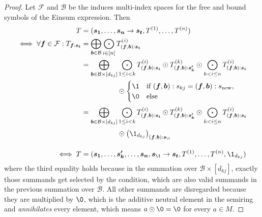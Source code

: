 \begin{proof}
    \small
    Let $\mathcal{F}$ and $\mathcal{B}$ be the induces multi-index spaces for the free and bound symbols of the Einsum expression.
    Then
    \begin{align*}
        T                                                        & = (\bm{s_1}, \dots, \bm{s_n} \rightarrow \bm{s_t}, T^{(1)}, \dots, T^{(n)})                                                                                                                                                                        \\
        \iff \forall \bm{f} \in \mathcal{F}: T_{\bm{f}:\bm{s_t}} & = \bigoplus\limits_{\bm{b} \in \mathcal{B}} \bigodot\limits_{i \in [n]} T^{(i)}_{(\bm{f}, \bm{b}):\bm{s_i}}                                                                                                                                        \\
                                                                 & = \bigoplus\limits_{\bm{b} \in \mathcal{B} \times [d_{kj}]} \bigodot\limits_{1 \leq i < k} T^{(i)}_{(\bm{f}, \bm{b}):\bm{s_i}} \odot T^{(k)}_{(\bm{f}, \bm{b}):\bm{s'_k}} \odot \bigodot\limits_{k < i \leq n} T^{(i)}_{(\bm{f}, \bm{b}):\bm{s_i}} \\
                                                                 & \phantom{{}=\bigoplus\limits_{\bm{b} \in \mathcal{B} \times [d_{kj}]}} \odot \begin{cases}
            \1 & \text{if $(\bm{f}, \bm{b}): s_{kj} = (\bm{f}, \bm{b}): s_{\text{new}}$}, \\
            \0 & \text{else}
        \end{cases}                                                                                                                                             \\
                                                                 & = \bigoplus\limits_{\bm{b} \in \mathcal{B} \times [d_{kj}]} \bigodot\limits_{1 \leq i < k} T^{(i)}_{(\bm{f}, \bm{b}):\bm{s_i}} \odot T^{(k)}_{(\bm{f}, \bm{b}):\bm{s'_k}} \odot \bigodot\limits_{k < i \leq n} T^{(i)}_{(\bm{f}, \bm{b}):\bm{s_i}} \\
                                                                 & \phantom{{}=\bigoplus\limits_{\bm{b} \in \mathcal{B} \times [d_{kj}]}} \odot \left(\1_{d_{kj}}\right)_{(\bm{f}, \bm{b}):\bm{s_\1}}                                                                                                                 \\
        \iff T                                                   & = (\bm{s_1}, \dots, \bm{s'_k}, \dots, \bm{s_n}, \bm{s_\1} \rightarrow \bm{s_t}, T^{(1)}, \dots, T^{(n)}, \1_{d_{kj}})
    \end{align*}
    where the third equality holds because in the summation over $\mathcal{B} \times [d_{kj}]$, exactly those summands get selected by the condition, which are also valid summands in the previous summation over $\mathcal{B}$.
    All other summands are disregarded because they are multiplied by $\0$, which is the additive neutral element in the semiring and \textit{annihilates} every element, which means $a \odot \0 = \0$ for every $a \in M$.
\end{proof}
\bigskip